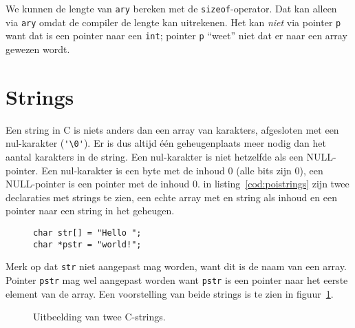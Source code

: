 We kunnen de lengte van \texttt{ary} bereken met de \texttt{sizeof}-operator. Dat kan alleen via \texttt{ary} omdat de compiler de lengte kan uitrekenen. Het kan \textsl{niet} via pointer \texttt{p} want dat is een pointer naar een \texttt{int}; pointer \texttt{p} ``weet'' niet dat er naar een array gewezen wordt.

\section{Strings}
\label{sec:strings}
Een string in C is niets anders dan een array van karakters, afgesloten met een nul-karakter (\lstinline|'\0'|). Er is dus altijd één geheugenplaats meer nodig dan het aantal karakters in de string. Een nul-karakter is niet hetzelfde als een NULL-pointer. Een nul-karakter is een byte met de inhoud 0 (alle bits zijn 0), een NULL-pointer is een pointer met de inhoud 0. in listing~\ref{cod:poistrings} zijn twee declaraties met strings te zien, een echte array met en string als inhoud en een pointer naar een string in het geheugen.

\begin{figure}[!ht]
\begin{lstlisting}[caption=Declaratie en initialisatie van twee C-strings.,label=cod:poistrings]
char str[] = "Hello ";
char *pstr = "world!";
\end{lstlisting}
\end{figure}

Merk op dat \texttt{str} niet aangepast mag worden, want dit is de naam van een array. Pointer \texttt{pstr} mag wel aangepast worden want \texttt{pstr} is een pointer naar het eerste element van de array. Een voorstelling van beide strings is te zien in figuur~\ref{fig:poistrings}.

\begin{figure}[!ht]
\centering
{}
\caption{Uitbeelding van twee C-strings.}
\label{fig:poistrings}
\end{figure}

